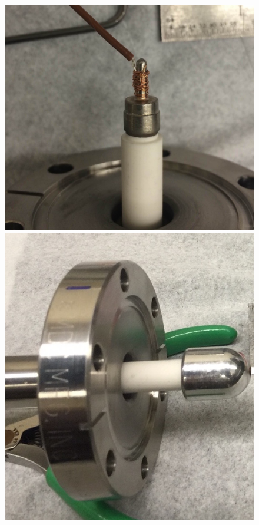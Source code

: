 \begin{figure}[htbp]
    \vspace*{1cm} %

    \begin{minipage}{0.47\textwidth}
    \includegraphics[width=\linewidth]{figures/testbed/ft3_3.jpg}
    \end{minipage}
    \hspace{\fill} %
    \begin{minipage}{0.4\textwidth}
    \includegraphics[width=\linewidth]{figures/testbed/ft3_4.jpg}

\end{minipage}
\end{figure}
